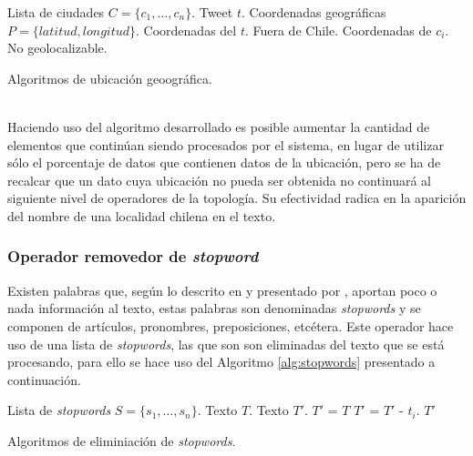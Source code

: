 \begin{algorithm}[H]
	\begin{algorithmic}
		\REQUIRE Lista de ciudades $C=\{c_{1}, \dots, c_{n} \}$.
		\REQUIRE Tweet $t$.
		\ENSURE Coordenadas geográficas $P=\{latitud, longitud\}$.
				\RETURN Coordenadas del $t$.
			\ELSE
				\RETURN Fuera de Chile.
			\ENDIF
		\ELSE
				\RETURN Coordenadas de $c_{i}$.
			\ELSE
				\RETURN No geolocalizable.
			\ENDIF
		\ENDIF
	\end{algorithmic}
	\caption{Algoritmos de ubicación geoográfica.}
	\label{alg:geolocalizacion}
\end{algorithm}\vphantom\\

Haciendo uso del algoritmo desarrollado es posible aumentar la cantidad de elementos que continúan siendo procesados por el sistema, en lugar de utilizar sólo el porcentaje de datos que contienen datos de la ubicación, pero se ha de recalcar que un dato cuya ubicación no pueda ser obtenida no continuará al siguiente nivel de operadores de la topología. Su efectividad radica en la aparición del nombre de una localidad chilena en el texto.

\subsubsection*{Operador removedor de \textit{stopword}}
\label{subsubsec:5op}

Existen palabras que, según lo descrito en \cite{IRQE} y presentado por \cite{JustifStopStemm}, aportan poco o nada información al texto, estas palabras son denominadas \textit{stopwords} y se componen de artículos, pronombres, preposiciones, etcétera. Este operador hace uso de una lista de \textit{stopwords}, las que son son eliminadas del texto que se está procesando, para ello se hace uso del Algoritmo \ref{alg:stopwords} presentado a continuación.\\

\begin{algorithm}[H]
	\begin{algorithmic}
		\REQUIRE Lista de \textit{stopwords} $S=\{s_{1}, \dots, s_{n} \}$.
		\REQUIRE Texto $T$.
		\ENSURE Texto $T'$.
		\STATE $T'$ = $T$
			\STATE $T'$ = $T'$ - $t_{i}$. 
			\ENDIF
		\ENDFOR
		\RETURN $T'$
	\end{algorithmic}
	\caption{Algoritmos de eliminiación de \textit{stopwords}.}
	\label{alg:stopwords}
\end{algorithm}\vphantom\\

